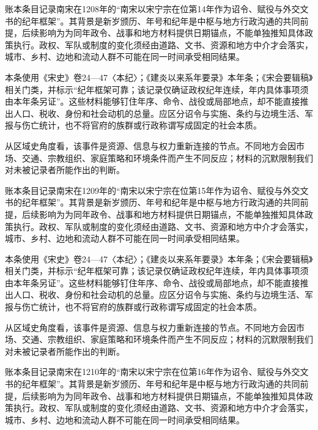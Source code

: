 账本条目记录南宋在1208年的“南宋以宋宁宗在位第14年作为诏令、赋役与外交文书的纪年框架”。其背景是新岁颁历、年号和纪年是中枢与地方行政沟通的共同前提，后续影响为为同年政令、战事和地方材料提供日期锚点，不能单独推知具体政策执行。政权、军队或制度的变化须经由道路、文书、资源和地方中介才会落实，城市、乡村、边地和流动人群不可能在同一时间承受相同结果。

本条使用《宋史》卷24—47〈本纪〉；《建炎以来系年要录》本年条；《宋会要辑稿》相关门类，并标示“纪年框架可靠；该记录仅确证政权纪年连续，年内具体事项须由本年条另证”。这些材料能够钉住年序、命令、战役或局部地点，却不能直接推出人口、税收、身份和社会动机的总量。应区分诏令与实施、条约与边境生活、军报与伤亡统计，也不将官府的族群或行政称谓写成固定的社会本质。

从区域史角度看，该事件是资源、信息与权力重新连接的节点。不同地方会因市场、交通、宗教组织、家庭策略和环境条件而产生不同反应；材料的沉默限制我们对未被记录者所能作出的判断。

账本条目记录南宋在1209年的“南宋以宋宁宗在位第15年作为诏令、赋役与外交文书的纪年框架”。其背景是新岁颁历、年号和纪年是中枢与地方行政沟通的共同前提，后续影响为为同年政令、战事和地方材料提供日期锚点，不能单独推知具体政策执行。政权、军队或制度的变化须经由道路、文书、资源和地方中介才会落实，城市、乡村、边地和流动人群不可能在同一时间承受相同结果。

本条使用《宋史》卷24—47〈本纪〉；《建炎以来系年要录》本年条；《宋会要辑稿》相关门类，并标示“纪年框架可靠；该记录仅确证政权纪年连续，年内具体事项须由本年条另证”。这些材料能够钉住年序、命令、战役或局部地点，却不能直接推出人口、税收、身份和社会动机的总量。应区分诏令与实施、条约与边境生活、军报与伤亡统计，也不将官府的族群或行政称谓写成固定的社会本质。

从区域史角度看，该事件是资源、信息与权力重新连接的节点。不同地方会因市场、交通、宗教组织、家庭策略和环境条件而产生不同反应；材料的沉默限制我们对未被记录者所能作出的判断。

账本条目记录南宋在1210年的“南宋以宋宁宗在位第16年作为诏令、赋役与外交文书的纪年框架”。其背景是新岁颁历、年号和纪年是中枢与地方行政沟通的共同前提，后续影响为为同年政令、战事和地方材料提供日期锚点，不能单独推知具体政策执行。政权、军队或制度的变化须经由道路、文书、资源和地方中介才会落实，城市、乡村、边地和流动人群不可能在同一时间承受相同结果。

